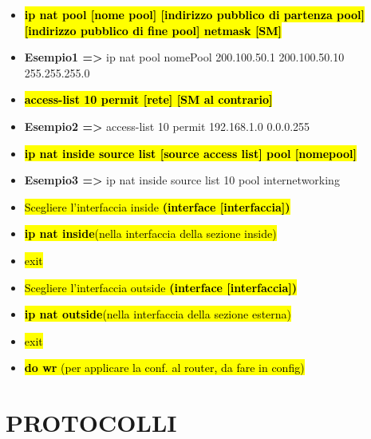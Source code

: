 \begin{itemize}
\item
  \textbf{\hl{ip nat pool {[}nome pool{]} {[}indirizzo pubblico di
  partenza pool{]} {[}indirizzo pubblico di fine pool{]} netmask
  {[}SM{]}}}
\item
  \textbf{Esempio1 =\textgreater{}} ip nat pool nomePool 200.100.50.1
  200.100.50.10 255.255.255.0
\item
  \textbf{\hl{access-list 10 permit {[}rete{]} {[}SM al contrario{]}}}
\item
  \textbf{Esempio2 =\textgreater{}} access-list 10 permit 192.168.1.0
  0.0.0.255
\item
  \textbf{\hl{ip nat inside source list {[}source access list{]} pool
  {[}nomepool{]}}}
\item
  \textbf{Esempio3 =\textgreater{}} ip nat inside source list 10 pool
  internetworking
\item
  \hl{Scegliere l'interfaccia inside \textbf{(interface
  {[}interfaccia{]})}}
\item
  \hl{\textbf{ip nat inside}(nella interfaccia della sezione inside)}
\item
  \hl{exit}
\item
  \hl{Scegliere l'interfaccia outside \textbf{(interface
  {[}interfaccia{]})}}
\item
  \hl{\textbf{ip nat outside}(nella interfaccia della sezione esterna)}
\item
  \hl{exit}
\item
  \hl{\textbf{do wr} (per applicare la conf. al router, da fare in
  config)}
\end{itemize}

\section{PROTOCOLLI}\label{protocolli}

